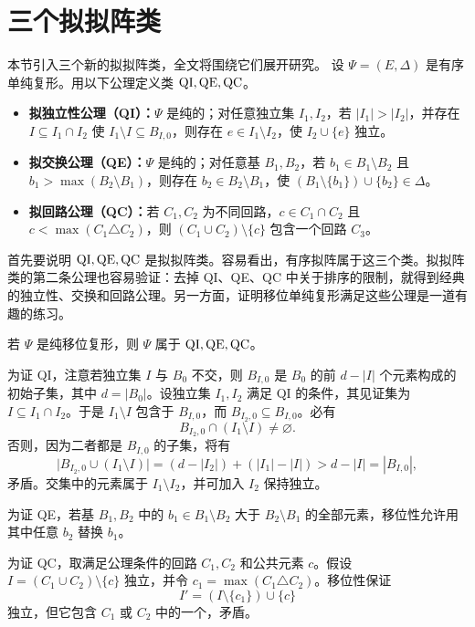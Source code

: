 \section{三个拟拟阵类}
本节引入三个新的拟拟阵类，全文将围绕它们展开研究。
设 $\Psi=(E,\Delta)$ 是有序单纯复形。用以下公理定义类 $\mathrm{QI},\mathrm{QE},\mathrm{QC}$。
\begin{itemize}
\item \textbf{拟独立性公理（QI）：}$\Psi$ 是纯的；对任意独立集 $I_1,I_2$，若 $|I_1|>|I_2|$，并存在 $I\subseteq I_1\cap I_2$ 使 $I_1\setminus I\subseteq B_{I,0}$，则存在 $e\in I_1\setminus I_2$，使 $I_2\cup\{e\}$ 独立。
\item \textbf{拟交换公理（QE）：}$\Psi$ 是纯的；对任意基 $B_1,B_2$，若 $b_1\in B_1\setminus B_2$ 且 $b_1>\max(B_2\setminus B_1)$，则存在 $b_2\in B_2\setminus B_1$，使 $(B_1\setminus\{b_1\})\cup\{b_2\}\in\Delta$。
\item \textbf{拟回路公理（QC）：}若 $C_1,C_2$ 为不同回路，$c\in C_1\cap C_2$ 且 $c<\max(C_1\triangle C_2)$，则 $(C_1\cup C_2)\setminus\{c\}$ 包含一个回路 $C_3$。
\end{itemize}

首先要说明 $\mathrm{QI},\mathrm{QE},\mathrm{QC}$ 是拟拟阵类。容易看出，有序拟阵属于这三个类。拟拟阵类的第二条公理也容易验证：去掉 QI、QE、QC 中关于排序的限制，就得到经典的独立性、交换和回路公理。另一方面，证明移位单纯复形满足这些公理是一道有趣的练习。

若 $\Psi$ 是纯移位复形，则 $\Psi$ 属于 $\mathrm{QI},\mathrm{QE},\mathrm{QC}$。
\begin{proofcn}
为证 QI，注意若独立集 $I$ 与 $B_0$ 不交，则 $B_{I,0}$ 是 $B_0$ 的前 $d-|I|$ 个元素构成的初始子集，其中 $d=|B_0|$。设独立集 $I_1,I_2$ 满足 QI 的条件，其见证集为 $I\subseteq I_1\cap I_2$。于是 $I_1\setminus I$ 包含于 $B_{I,0}$，而 $B_{I_2,0}\subseteq B_{I,0}$。必有
\[
B_{I_2,0}\cap(I_1\setminus I)\ne\varnothing.
\]
否则，因为二者都是 $B_{I,0}$ 的子集，将有
\[
\big|B_{I_2,0}\cup(I_1\setminus I)\big|
=(d-|I_2|)+(|I_1|-|I|)>d-|I|=|B_{I,0}|,
\]
矛盾。交集中的元素属于 $I_1\setminus I_2$，并可加入 $I_2$ 保持独立。

为证 QE，若基 $B_1,B_2$ 中的 $b_1\in B_1\setminus B_2$ 大于 $B_2\setminus B_1$ 的全部元素，移位性允许用其中任意 $b_2$ 替换 $b_1$。

为证 QC，取满足公理条件的回路 $C_1,C_2$ 和公共元素 $c$。假设 $I=(C_1\cup C_2)\setminus\{c\}$ 独立，并令 $c_1=\max(C_1\triangle C_2)$。移位性保证
\[
I'=(I\setminus\{c_1\})\cup\{c\}
\]
独立，但它包含 $C_1$ 或 $C_2$ 中的一个，矛盾。
\end{proofcn}

